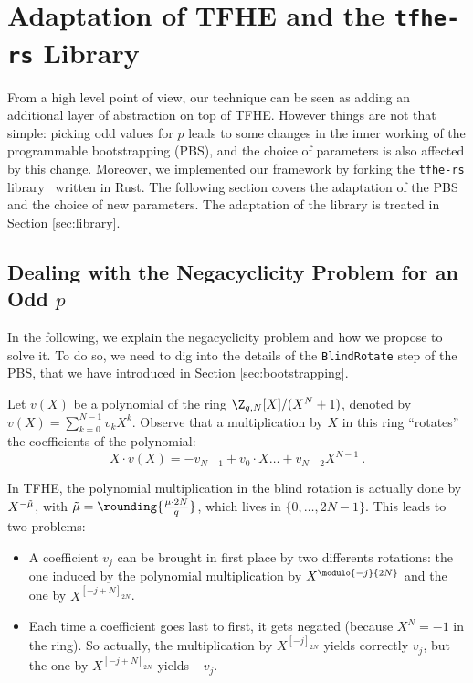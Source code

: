 \section{Adaptation of TFHE and the \texttt{tfhe-rs} Library}
\label{sec:TFHE_adaptation}

From a high level point of view, our technique can be seen as adding an additional layer of abstraction on top of TFHE. However things are not that simple: picking odd values for $p$ leads to some changes in the inner working of the programmable bootstrapping (PBS), and the choice of parameters is also affected by this change. Moreover, we implemented our framework by forking the \texttt{tfhe-rs} library~\cite{tfhe-rs} written in Rust. The following section covers the adaptation of the PBS and the choice of new parameters. The adaptation of the library is treated in Section \ref{sec:library}.

\subsection{Dealing with the Negacyclicity Problem for an Odd $p$}
\label{sec:solving_negacyclicity}

In the following, we explain the negacyclicity problem and how we propose to solve it. To do so, we need to dig into the details of the \texttt{BlindRotate} step of the PBS, that we have introduced in Section \ref{sec:bootstrapping}.

Let $v(X)$ be a polynomial of the ring $\Z_{q, N}[X]/(X^N+1)$, denoted by $v(X) = \sum_{k=0}^{N-1} v_k X^k$. Observe that a multiplication by $X$  in this ring ``rotates'' the coefficients of the polynomial: \[X \cdot v(X) = - v_{N - 1} + v_0 \cdot X \dots + v_{N - 2} X^{N - 1}~.\]

In TFHE, the polynomial multiplication in the blind rotation is actually done by $X^{-\Tilde{\mu}}$, with $\Tilde{\mu} = \rounding{\frac{\mu \cdot 2N}{q}}$, which lives in $\{0, \dots, 2N - 1\}$. This leads to two problems:

\begin{itemize}
    \item A coefficient $v_j$ can be brought in first place by two differents rotations: the one induced by the polynomial multiplication by $X^{\modulo{-j}{2N}}$ and the one by $X^{[-j + N]_{2N}}$.
    \item Each time a coefficient goes last to first, it gets negated (because $X^N = -1$ in the ring). So actually, the multiplication by $X^{[-j]_{2N}}$ yields correctly $v_j$, but the one by $X^{[-j + N]_{2N}}$ yields $-v_j$.
\end{itemize}


